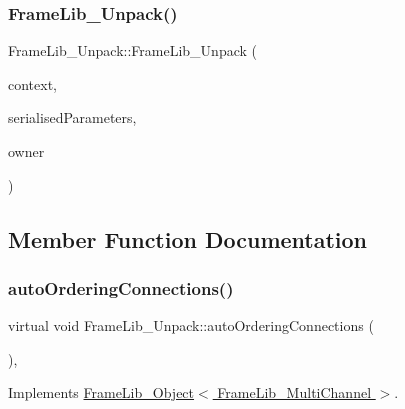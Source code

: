 \subsubsection{\texorpdfstring{Frame\+Lib\+\_\+\+Unpack()}{FrameLib\_Unpack()}}
{\footnotesize\ttfamily Frame\+Lib\+\_\+\+Unpack\+::\+Frame\+Lib\+\_\+\+Unpack (\begin{DoxyParamCaption}\item[{\hyperlink{class_frame_lib___context}{Frame\+Lib\+\_\+\+Context}}]{context,  }\item[{\hyperlink{class_frame_lib___parameters_1_1_serial}{Frame\+Lib\+\_\+\+Parameters\+::\+Serial} $\ast$}]{serialised\+Parameters,  }\item[{void $\ast$}]{owner }\end{DoxyParamCaption})}



\subsection{Member Function Documentation}
\mbox{\label{class_frame_lib___unpack_a4bbf83c7d4bd8c96acd2283afa0ed2c2}} 
\subsubsection{\texorpdfstring{auto\+Ordering\+Connections()}{autoOrderingConnections()}}
{\footnotesize\ttfamily virtual void Frame\+Lib\+\_\+\+Unpack\+::auto\+Ordering\+Connections (\begin{DoxyParamCaption}{ }\end{DoxyParamCaption})\hspace{0.3cm}{\ttfamily [inline]}, {\ttfamily [virtual]}}



Implements \hyperlink{class_frame_lib___object_afa5bb93302a641c23b5eac7ab0dfe516}{Frame\+Lib\+\_\+\+Object$<$ Frame\+Lib\+\_\+\+Multi\+Channel $>$}.

\mbox{\label{class_frame_lib___unpack_a99d42ef7daadceeda8e3aa34afb249f5}} 
